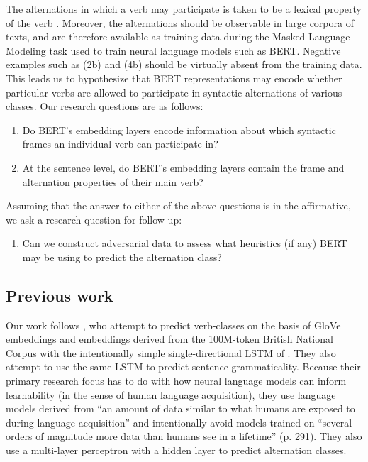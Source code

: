 \documentclass[11pt]{article}
\begin{document}
The alternations in which a verb may participate is taken to be a lexical property of the verb \citep[e.g.][]{pinker1989,levin1993,levin1995unaccusativity,shafer2009causative}.  Moreover, the alternations should be observable in large corpora of texts, and are therefore available as training data during the Masked-Language-Modeling task used to train neural language models such as BERT.  Negative examples such as (2b) and (4b) should be virtually absent from the training data.  This leads us to hypothesize that BERT representations may encode whether particular verbs are allowed to participate in syntactic alternations of various classes.  Our research questions are as follows:

\begin{enumerate}
    \item Do BERT's embedding layers encode information about which syntactic frames an individual verb can participate in?
    \item At the sentence level, do BERT's embedding layers contain the frame and alternation properties of their main verb?
\end{enumerate}

Assuming that the answer to either of the above questions is in the affirmative, we ask a research question for follow-up:

\begin{enumerate}[resume]
    \item Can we construct adversarial data to assess what heuristics (if any) BERT may be using to predict the alternation class?
\end{enumerate}

\subsection{Previous work}
Our work follows \citet{kann2018verb}, who attempt to predict verb-classes on the basis of GloVe embeddings \citep{glove} and embeddings derived from the 100M-token British National Corpus with the intentionally simple single-directional LSTM of \citealt{warstadt2019neural}.  They also attempt to use the same LSTM to predict sentence grammaticality.  Because their primary research focus has to do with how neural language models can inform learnability (in the sense of human language acquisition), they use language models derived from ``an amount of data similar to what humans are exposed to during language acquisition'' and intentionally avoid models trained on ``several orders of magnitude more data than humans see in a lifetime'' (p. 291).  They also use a multi-layer perceptron with a hidden layer to predict alternation classes.  
\end{document}
